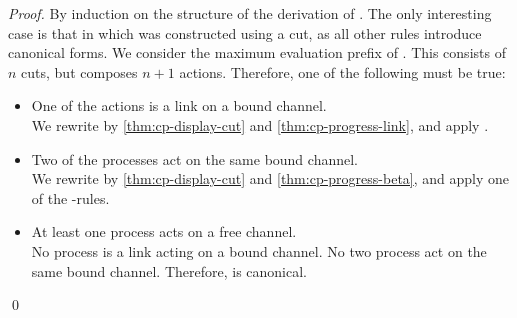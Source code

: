 \documentclass[UKenglish]{llncs}
\begin{document}
\begin{proof}
  By induction on the structure of the derivation of \seq[P]{\Gamma}.
  The only interesting case is that in which  was constructed using a cut,
  as all other rules introduce canonical forms.
  We consider the maximum evaluation prefix  of . This consists of
  $n$ cuts, but composes $n+1$ actions. Therefore, one of the following must be
  true:
  \begin{itemize}
  \item
    One of the actions is a link on a bound channel.\\
    We rewrite by \cref{thm:cp-display-cut} and \cref{thm:cp-progress-link},
    and apply .
  \item
    Two of the processes act on the same bound channel.\\
    We rewrite by \cref{thm:cp-display-cut} and \cref{thm:cp-progress-beta},
    and apply one of the \textbeta-rules.
  \item
    At least one process acts on a free channel.\\
    No process is a link acting on a bound channel. No two process act on the
    same bound channel. Therefore,  is canonical.
  \end{itemize}
  \qed
\end{proof}
\end{document}
